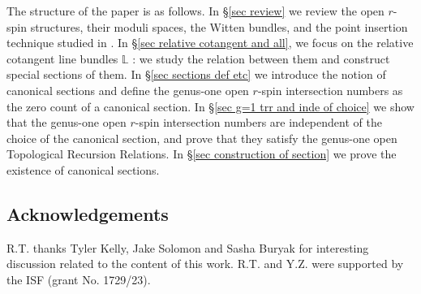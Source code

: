 \documentclass[11pt]{amsart}
\theoremstyle{definition}
\theoremstyle{remark}
\newcommand{\<}{\left<}
\renewcommand{\>}{\right>}
\numberwithin{equation}{section}
\begin{document}
The structure of the paper is as follows. In \S\ref{sec review} we review the open $r$-spin structures, their moduli spaces, the Witten bundles, and the point insertion technique studied in \cite{BCT1,TZ1}. %
In \S \ref{sec relative  cotangent and all}, we %
focus on the relative cotangent line bundles $\mathbb L$%
: we study %
the relation between them and construct special sections of them. In \S \ref{sec sections def etc} we introduce the notion of canonical sections and define the genus-one open $r$-spin intersection numbers as the zero count of a canonical section. In \S \ref{sec g=1 trr  and inde of choice} we show that the genus-one open $r$-spin intersection numbers are independent of the choice of the %
canonical section, and %
prove that they satisfy the genus-one %
open Topological Recursion Relations. In %
\S\ref{sec construction of section} we prove the existence of canonical %
sections.


\subsection{Acknowledgements}
R.T. thanks Tyler Kelly, Jake Solomon and Sasha Buryak for interesting discussion related to the content of this work. R.T. and Y.Z. were supported by the ISF (grant No. 1729/23).
\end{document}
